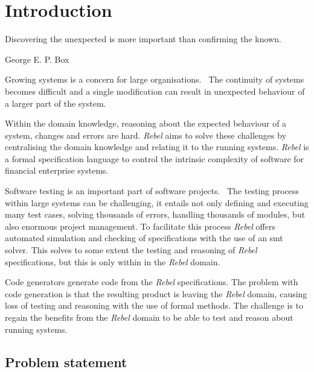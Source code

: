 \chapter{Introduction}

\epigraph{Discovering the unexpected is more important than confirming the
known.}{George E. P. Box}

Growing systems is a concern for large
organisations.~\cite[p.~1]{stoel_storm_vinju_bosman_2016} The continuity of
systems becomes difficult and a single modification can result in unexpected
behaviour of a larger part of the system.

Within the domain knowledge, reasoning about the expected behaviour of a system,
changes and errors are hard. \textit{Rebel} aims to solve these challenges by centralising the domain knowledge and relating
it to the running systems. \textit{Rebel} is a formal specification language to
control the intrinsic complexity of software for financial
enterprise systems.~\cite[p.~1]{stoel_storm_vinju_bosman_2016}

Software testing is an important part of software projects.~\cite[p.~4]{myers2011art} The testing
process within large systems can be challenging, it entails not only defining
and executing many test cases, solving thousands of errors, handling
thousands of modules, but also enormous project management. To facilitate this
process \textit{Rebel} offers automated simulation and checking of specifications with
the use of an \gls{smt} solver. This solves to some
extent the testing and reasoning of \textit{Rebel} specifications, but this is only
within in the \textit{Rebel} domain.

Code generators generate code from the \textit{Rebel} specifications. The problem with code generation is that the resulting
product is leaving the \textit{Rebel} domain, causing loss of testing and reasoning with
the use of formal methods. The challenge is to regain the benefits from the
\textit{Rebel} domain to be able to test and reason about running systems.

\section{Problem statement}\label{sec:problem-statement}


